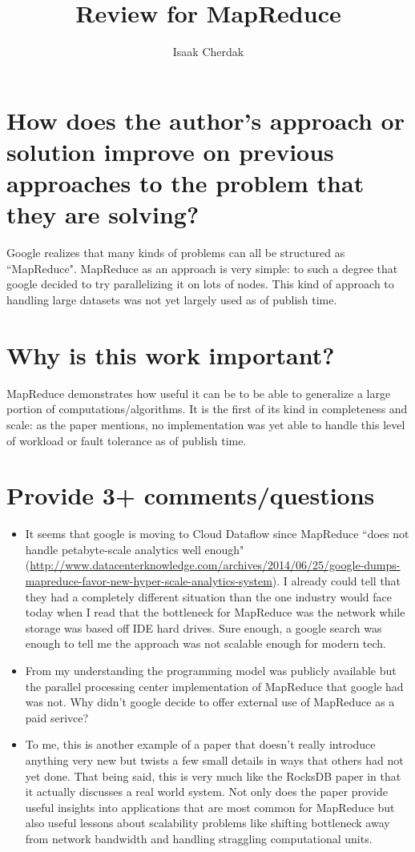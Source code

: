 \documentclass{article}
\title{Review for MapReduce}
\author{Isaak Cherdak}
\begin{document}
\maketitle

\section{How does the author's approach or solution improve on previous
approaches to the problem that they are solving?}

Google realizes that many kinds of problems can all be structured as
``MapReduce". MapReduce as an approach is very simple: to such a degree
that google decided to try parallelizing it on lots of nodes. This kind of
approach to handling large datasets was not yet largely used as of publish time.

\section{Why is this work important?}

MapReduce demonstrates how useful it can be to be able to generalize a large
portion of computations/algorithms. It is the first of its kind in completeness
and scale: as the paper mentions, no implementation was yet able to handle this
level of workload or fault tolerance as of publish time.

\section{Provide 3+ comments/questions}

\begin{itemize}
  \item It seems that google is moving to Cloud Dataflow since MapReduce ``does
    not handle petabyte-scale analytics well enough"
    (\url{http://www.datacenterknowledge.com/archives/2014/06/25/google-dumps-mapreduce-favor-new-hyper-scale-analytics-system}).
    I already could tell that they had a completely different situation than the
    one industry would face today when I read that the bottleneck for MapReduce
    was the network while storage was based off IDE hard drives. Sure enough, a
    google search was enough to tell me the approach was not scalable enough for
    modern tech.
  \item From my understanding the programming model was publicly available but
    the parallel processing center implementation of MapReduce that google had
    was not. Why didn't google decide to offer external use of MapReduce as a
    paid serivce?
  \item To me, this is another example of a paper that doesn't really introduce
    anything very new but twists a few small details in ways that others had not
    yet done. That being said, this is very much like the RocksDB paper in that
    it actually discusses a real world system. Not only does the paper provide
    useful insights into applications that are most common for MapReduce but
    also useful lessons about scalability problems like shifting bottleneck away
    from network bandwidth and handling straggling computational units.
\end{itemize}
\end{document}

